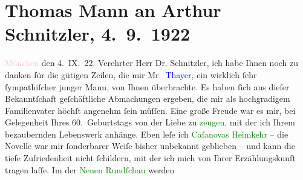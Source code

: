 

               \section[Thomas Mann an Arthur Schnitzler, 4. 9. 1922]{ Thomas Mann an Arthur Schnitzler, 4. 9. 1922}\nopagebreak{}\rehead{ }\normalsize\beginnumbering{} \toendnotes[C]{\smallbreak\pagebreak[2]} 
\toendnotes[C]{\smallbreak}\pstart
           \raggedleft{}{\pb}\textcolor{pink}{München}{}\ledrightnote{\textcolor{pink}{München}} den 4. IX. 22.\pend
           \pstart{}Verehrter Herr Dr. Schnitzler,\pend\pstart
           ich habe Ihnen noch zu danken für die gütigen Zeilen, die mir Mr. \textcolor{blue}{Thayer}{}\ledrightnote{\textcolor{blue}{Scofield Thayer}}, ein wirklich ſehr ſympathiſcher junger Mann, von Ihnen
               überbrachte. Es haben ſich aus dieſer Bekanntſchaft geſchäftliche Abmachungen
               ergeben, die mir als hochgradigem Familienvater höchſt angenehm ſein müſſen.\pend
           \pstart
           Eine große Freude war es mir, bei Gelegenheit Ihres 60. Geburtstags von der Liebe zu
                  \textcolor{green}{zeugen}{}, mit der ich Ihrem
               bezaubernden Lebenswerk anhänge. Eben leſe ich \textcolor{green}{Caſanovas
                  Heimkehr}{}\ledrightnote{\textcolor{green}{Casanovas Heimfahrt}} – die Novelle war mir ſonderbarer Weiſe bisher unbekannt geblieben –
               und kann die tiefe Zufriedenheit nicht ſchildern, mit der ich {\pb}mich von Ihrer Erzählungskunſt tragen
               laſſe.\pend
           \pstart
           Im \label{K_L02392_1v}\label{K_L02392_1h} der \textcolor{green}{Neuen Rundſchau}{}\ledrightnote{\textcolor{green}{Die neue Rundschau}} werden
